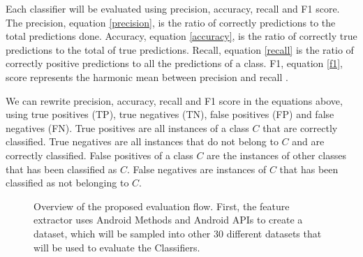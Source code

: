 Each classifier will be evaluated using precision, accuracy, recall and F1 score. The precision, equation 
\ref{precision}, is the ratio of correctly predictions to the total predictions done. Accuracy, equation 
\ref{accuracy}, is the ratio of correctly true predictions to the total of true predictions. Recall, equation 
\ref{recall} is the ratio of correctly positive predictions to all the predictions of a class. F1, equation 
\ref{f1}, score represents the harmonic mean between precision and recall \cite{sasaki2007truth}.

We can rewrite precision, accuracy, recall and F1 score in the equations above, using true positives (TP), true 
negatives (TN), false positives (FP) and false negatives (FN). True positives are all instances of a class $C$ that 
are correctly classified. True negatives are all instances that do not belong to $C$ and are correctly classified. 
False positives of a class $C$ are the instances of other classes that has been classified as $C$. False negatives 
are instances of $C$ that has been classified as not belonging to $C$.

\begin{figure}[!h]
    \begin{center}
        
    \end{center}
    \caption{%
        Overview of the proposed evaluation flow. First, the feature extractor uses Android Methods and %
        Android APIs to create a dataset, which will be sampled into other 30 different datasets that will be used %
        to evaluate the Classifiers.%
    }\label{flow}
\end{figure}

